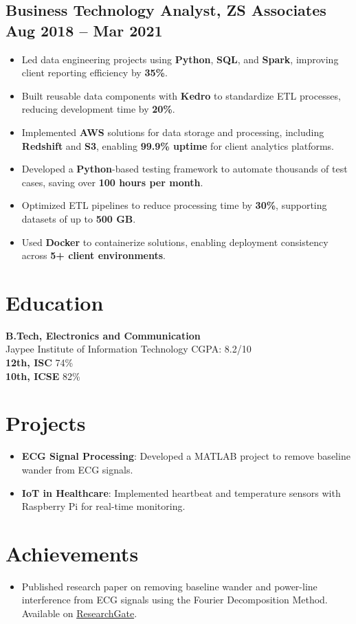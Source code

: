 \documentclass[a4paper,10pt]{article}
\begin{document}
\subsection*{Business Technology Analyst, ZS Associates \hfill Aug 2018 -- Mar 2021}
\begin{itemize}
    \item Led data engineering projects using \textbf{Python}, \textbf{SQL}, and \textbf{Spark}, improving client reporting efficiency by \textbf{35\%}.
    \item Built reusable data components with \textbf{Kedro} to standardize ETL processes, reducing development time by \textbf{20\%}.
    \item Implemented \textbf{AWS} solutions for data storage and processing, including \textbf{Redshift} and \textbf{S3}, enabling \textbf{99.9\% uptime} for client analytics platforms.
    \item Developed a \textbf{Python}-based testing framework to automate thousands of test cases, saving over \textbf{100 hours per month}.
    \item Optimized ETL pipelines to reduce processing time by \textbf{30\%}, supporting datasets of up to \textbf{500 GB}.
    \item Used \textbf{Docker} to containerize solutions, enabling deployment consistency across \textbf{5+ client environments}.
\end{itemize}


\section*{Education}
\textbf{B.Tech, Electronics and Communication} \\
Jaypee Institute of Information Technology \hfill CGPA: 8.2/10 \\
\textbf{12th, ISC} \hfill 74\% \\
\textbf{10th, ICSE} \hfill 82\%

\section*{Projects}
\begin{itemize}
    \item \textbf{ECG Signal Processing}: Developed a MATLAB project to remove baseline wander from ECG signals.
    \item \textbf{IoT in Healthcare}: Implemented heartbeat and temperature sensors with Raspberry Pi for real-time monitoring.
\end{itemize}

\section*{Achievements}
\begin{itemize}
    \item Published research paper on removing baseline wander and power-line interference from ECG signals using the Fourier Decomposition Method. Available on \href{https://www.researchgate.net/publication/326903400_Baseline_Wander_and_Power-Line_Interference_Removal_from_ECG_Signals_Using_Fourier_Decomposition_Method}{ResearchGate}.
\end{itemize}
\end{document}

